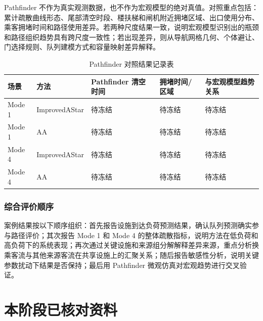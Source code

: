 \documentclass[UTF8,a4paper,12pt]{ctexart}
\begin{document}
Pathfinder 不作为真实观测数据，也不作为宏观模型的绝对真值。对照重点包括：累计疏散曲线形态、尾部清空时段、楼扶梯和闸机附近拥堵区域、出口使用分布、乘客拥堵时间和路径使用差异。若两种尺度结果一致，说明宏观模型识别出的瓶颈和路径组织趋势具有跨尺度一致性；若出现差异，则从导航网格几何、个体避让、门选择规则、队列建模方式和容量映射差异解释。

\begin{table}[htbp]
\centering
\caption{Pathfinder 对照结果记录表}
\small
\begin{tabular}{p{}p{}p{}p{}p{}}
\toprule
场景 & 方法 & Pathfinder 清空时间 & 拥堵时间/区域 & 与宏观模型趋势关系 \\
\midrule
Mode 1 & ImprovedAStar & 待冻结 & 待冻结 & 待冻结 \\
Mode 1 & AA & 待冻结 & 待冻结 & 待冻结 \\
Mode 4 & ImprovedAStar & 待冻结 & 待冻结 & 待冻结 \\
Mode 4 & AA & 待冻结 & 待冻结 & 待冻结 \\
\bottomrule
\end{tabular}
\end{table}

\subsubsection{综合评价顺序}

案例结果按以下顺序组织：首先报告设施到达负荷预测结果，确认队列预测确实参与路径评价；其次报告 Mode 1 和 Mode 4 的整体疏散指标，说明方法在低负荷和高负荷下的系统表现；再次通过关键设施和来源组分解解释差异来源，重点分析换乘客流与其他来源客流在共享设施上的汇聚关系；随后报告敏感性分析，说明关键参数扰动下结果是否保持；最后用 Pathfinder 微观仿真对宏观趋势进行交叉验证。

\section*{本阶段已核对资料}
\end{document}
